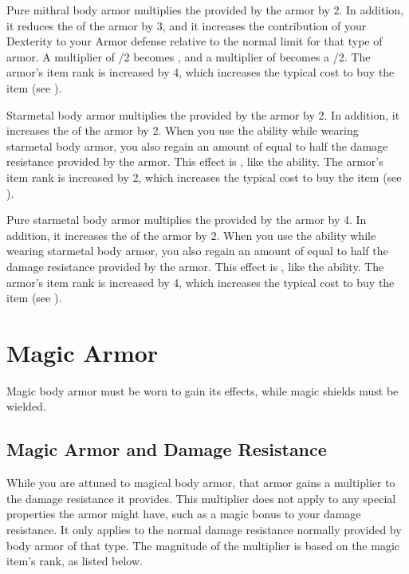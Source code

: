         Pure mithral body armor multiplies the  provided by the armor by 2.
        In addition, it reduces the  of the armor by 3, and it increases the contribution of your Dexterity to your Armor defense relative to the normal limit for that type of armor.
        A multiplier of /2 becomes , and a multiplier of  becomes a /2.
        The armor's item rank is increased by 4, which increases the typical cost to buy the item (see ).

         Starmetal body armor multiplies the  provided by the armor by 2.
        In addition, it increases the  of the armor by 2.
        When you use the  ability while wearing starmetal body armor, you also regain an amount of  equal to half the damage resistance provided by the armor.
        This effect is , like the  ability.
        The armor's item rank is increased by 2, which increases the typical cost to buy the item (see ).

         Pure starmetal body armor multiplies the  provided by the armor by 4.
        In addition, it increases the  of the armor by 2.
        When you use the  ability while wearing starmetal body armor, you also regain an amount of  equal to half the damage resistance provided by the armor.
        This effect is , like the  ability.
        The armor's item rank is increased by 4, which increases the typical cost to buy the item (see ).

\newpage
\section{Magic Armor}
    Magic body armor must be worn to gain its effects, while magic shields must be wielded.

    \subsection{Magic Armor and Damage Resistance}
        While you are attuned to magical body armor, that armor gains a multiplier to the damage resistance it provides.
        This multiplier does not apply to any special properties the armor might have, such as a magic bonus to your damage resistance.
        It only applies to the normal damage resistance normally provided by body armor of that type.
        The magnitude of the multiplier is based on the magic item's rank, as listed below.

